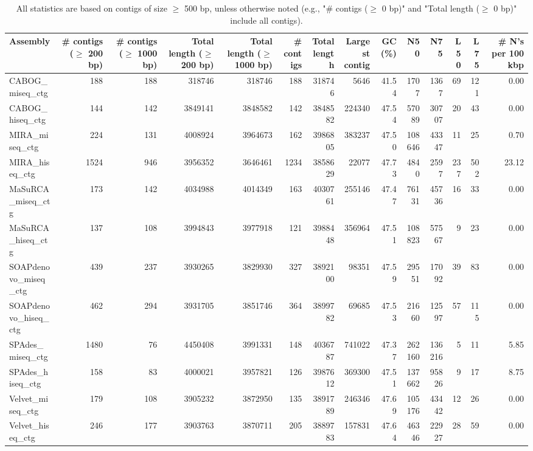 \documentclass[12pt,a4paper]{article}
\begin{document}
\begin{table}[ht]
\begin{center}
\caption{All statistics are based on contigs of size $\geq$ 500 bp, unless otherwise noted (e.g., "\# contigs ($\geq$ 0 bp)" and "Total length ($\geq$ 0 bp)" include all contigs).}
\begin{tabular}{|l*{13}{|r}|}
\hline
Assembly & \# contigs ($\geq$ 200 bp) & \# contigs ($\geq$ 1000 bp) & Total length ($\geq$ 200 bp) & Total length ($\geq$ 1000 bp) & \# contigs & Total length & Largest contig & GC (\%) & N50 & N75 & L50 & L75 & \# N's per 100 kbp \\ \hline
CABOG\_miseq\_ctg & 188 & 188 & 318746 & 318746 & 188 & 318746 & 5646 & 41.54 & 1707 & 1367 & 69 & 121 & 0.00 \\ \hline
CABOG\_hiseq\_ctg & 144 & 142 & 3849141 & 3848582 & 142 & 3848582 & 224340 & 47.54 & 57089 & 30707 & 20 & 43 & 0.00 \\ \hline
MIRA\_miseq\_ctg & 224 & 131 & 4008924 & 3964673 & 162 & 3986805 & 383237 & 47.50 & 108646 & 43347 & 11 & 25 & 0.70 \\ \hline
MIRA\_hiseq\_ctg & 1524 & 946 & 3956352 & 3646461 & 1234 & 3858629 & 22077 & 47.73 & 4840 & 2597 & 237 & 502 & 23.12 \\ \hline
MaSuRCA\_miseq\_ctg & 173 & 142 & 4034988 & 4014349 & 163 & 4030761 & 255146 & 47.47 & 76131 & 45736 & 16 & 33 & 0.00 \\ \hline
MaSuRCA\_hiseq\_ctg & 137 & 108 & 3994843 & 3977918 & 121 & 3988448 & 356964 & 47.51 & 108823 & 57567 & 9 & 23 & 0.00 \\ \hline
SOAPdenovo\_miseq\_ctg & 439 & 237 & 3930265 & 3829930 & 327 & 3892100 & 98351 & 47.59 & 29551 & 17092 & 39 & 83 & 0.00 \\ \hline
SOAPdenovo\_hiseq\_ctg & 462 & 294 & 3931705 & 3851746 & 364 & 3899782 & 69685 & 47.53 & 21660 & 12597 & 57 & 115 & 0.00 \\ \hline
SPAdes\_miseq\_ctg & 1480 & 76 & 4450408 & 3991331 & 148 & 4036787 & 741022 & 47.37 & 262160 & 136216 & 5 & 11 & 5.85 \\ \hline
SPAdes\_hiseq\_ctg & 158 & 83 & 4000021 & 3957821 & 126 & 3987612 & 369300 & 47.51 & 137662 & 95826 & 9 & 17 & 8.75 \\ \hline
Velvet\_miseq\_ctg & 179 & 108 & 3905232 & 3872950 & 135 & 3891789 & 246346 & 47.69 & 105176 & 43442 & 12 & 26 & 0.00 \\ \hline
Velvet\_hiseq\_ctg & 246 & 177 & 3903763 & 3870711 & 205 & 3889783 & 157831 & 47.64 & 46346 & 22927 & 28 & 59 & 0.00 \\ \hline
\end{tabular}
\end{center}
\end{table}
\end{document}
